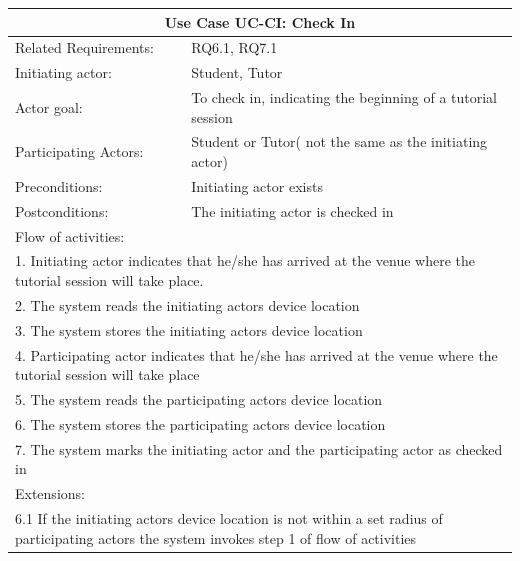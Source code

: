\documentclass[12pt]{article}
\begin{document}
		\begin{tabular}{| l | p{10cm}| }
			\hline\multicolumn{2}{|c|}{ \textbf{Use Case UC-CI: Check In } }\\ \hline
			Related Requirements: &  RQ6.1, RQ7.1\\ \hline
			Initiating actor: & Student, Tutor \\ \hline
			Actor goal: & To check in, indicating the beginning of a tutorial session\\ \hline
			Participating Actors: & Student or Tutor( not the same as the initiating actor)\\ \hline
			Preconditions: &Initiating actor exists\\ \hline
			Postconditions: & The initiating actor is checked in\\ \hline
			\multicolumn{2}{|l|}{Flow of activities:}\\ \hline
			\multicolumn{2}{|p{15cm}|}{1. Initiating actor indicates that he/she has arrived at the venue where the tutorial session will take place.}\\
			\multicolumn{2}{|p{15cm}|}{2. The system reads the initiating actors device location}\\
			\multicolumn{2}{|p{15cm}|}{3. The system stores the initiating actors device location}\\
			\multicolumn{2}{|p{15cm}|}{4. Participating actor indicates that he/she has arrived at the venue where the tutorial session will take place}\\
			\multicolumn{2}{|l|}{5. The system reads the participating actors device location}\\
			\multicolumn{2}{|l|}{6. The system stores the participating actors device location}\\
			\multicolumn{2}{|l|}{7. The system marks the initiating actor and the participating actor as checked in}\\
			\hline
			\multicolumn{2}{|l|}{Extensions: }\\ \hline
			\multicolumn{2}{|p{15cm}|}{6.1 If the initiating actors device location is not within a set radius of participating actors the system invokes step 1 of flow of activities }\\
			\hline
		\end{tabular}
\end{document}
